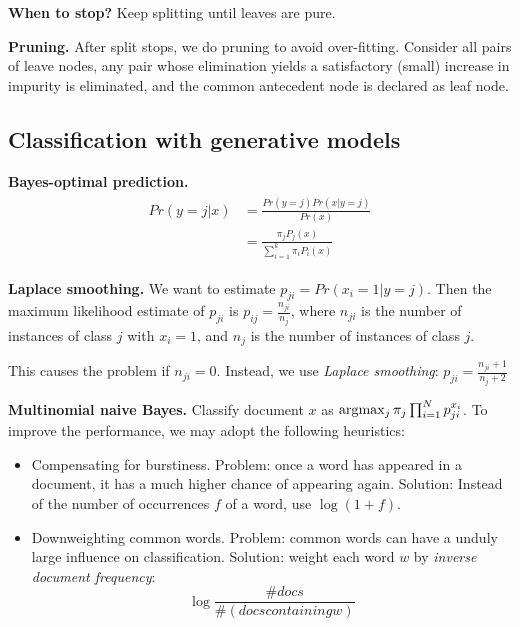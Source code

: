 \textbf{When to stop?}\hspace{0.2cm} Keep splitting until leaves are pure. 

\textbf{Pruning.}\hspace{0.2cm} After split stops, we do pruning to avoid over-fitting. Consider all pairs of leave nodes,
any pair whose elimination yields a satisfactory (small)
increase in impurity is eliminated, and the common
antecedent node is declared as leaf node.

\subsection{Classification with generative models}

\textbf{Bayes-optimal prediction.}\hspace{0.2cm}
\begin{align}
	\begin{split}
	Pr(y= j | x) &= \frac{Pr(y= j) Pr(x|y=j)}{Pr(x)} \\
		&= \frac{\pi_j P_j(x)}{\sum_{i=1}^{k} \pi_i P_i(x)}
	\end{split}
\end{align}


\textbf{Laplace smoothing.}\hspace{0.2cm}
We want to estimate $p_{ji} = Pr(x_i = 1 | y=j)$. Then the maximum likelihood estimate of $p_{ji}$ is $p_{ij} = \frac{n_{ji}}{n_j}$, where $n_{ji}$ is the number of instances of class $j$ with $x_i = 1$, and $n_j$ is the number of 
instances of class $j$. 
\begin{remark}
This causes the problem if $n_{ji} = 0$. Instead, we use \textit{Laplace smoothing}: $p_{ji} = \frac{n_{ji} + 1}{n_j + 2}$
\end{remark} 


\textbf{Multinomial naive Bayes.}\hspace{0.2cm}
Classify document $x$ as $\arg\!\max_j \pi_j \prod_{i=1}^{N} p_{ji} ^ {x_i}$.
To improve the performance, we may adopt the following heuristics:
\begin{itemize}
	\item Compensating for burstiness. Problem: once a word has appeared in a document, it has a much higher chance of appearing again.
	Solution: Instead of the number of occurrences $f$ of a word, use
	$\log(1 + f )$.
	
	\item Downweighting common words. Problem: common words can have a unduly large influence on classification. Solution: weight each word $w$ by \textit{inverse document frequency}:
	\[
		\log\frac{\# docs}{\#(docs containing w)}
	\]
\end{itemize}

